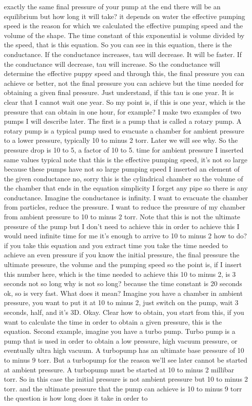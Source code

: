 exactly the same final pressure of your pump at the end there will be an equilibrium but how long it will take? it depends on water the effective pumping speed is the reason for which we calculated the effective pumping speed and the volume of the shape. The time constant of this exponential is volume divided by the speed, that is this equation. So you can see in this equation, there is the conductance. If the conductance increases, tau will decrease. It will be faster. If the conductance will decrease, tau will increase. So the conductance will determine the effective puppy speed and through this, the final pressure you can achieve or better, not the final pressure you can achieve but the time needed for obtaining a given final pressure. Just understand, if this tau is one year. It is clear that I cannot wait one year. So my point is, if this is one year, which is the pressure that can obtain in one hour, for example? I make two examples of two pumps I will describe later. The first is a pump that is called a rotary pump. A rotary pump is a typical pump used to evacuate a chamber for ambient pressure to a lower pressure, typically 10 to minus 2 torr. Later we will see why. So the pressure drop is 10 to 5, a factor of 10 to 5. time for ambient pressure I inserted same values typical note that this is the effective pumping speed, it's not so large because these pumps have not so large pumping speed I inserted an element of the given conductance no, sorry this is the cylindrical chamber so the volume of the chamber that ends in the equation simplicity I forget any pipe so there is any conductance. Imagine the conductance is infinity. I want to evacuate the chamber from particles, reduce the pressure. I want to reduce the pressure of my chamber from ambient pressure to 10 to minus 2 torr. Note that this is not the ultimate pressure of the pump but I don't need to achieve this in order to achieve this I would need infinite time for me it's enough to arrive to 10 to minus 2 how to do? if you take this equation and you extract time you take the time needed to achieve an even pressure if you know the initial pressure, the final pressure the ultimate pressure, the volume and the pumping speed so the point is, if I insert this number here, which is the time needed to achieve this 10 to minus 2, is 3 seconds not so long why is not so long? because the time constant is 20 seconds ok, so is very fast. What does it mean? Imagine you have a chamber in ambient pressure, you want to put it at 10 to minus 2, just switch on the pump, wait 3 seconds, half, and it's 3D. Okay. Clear how to obtain, you start from this, if you want to calculate the time in order to obtain a given pressure, this is the equation. Second example, imagine you have a turbo pump. Turbo pump is a pump that is used in order to obtain a low pressure, high vacuum pressure, or eventually ultra high vacuum. A turbopump has an ultimate base pressure of 10 to minus 9 torr. But a turbopump for the reason we'll see later cannot be started at ambient pressure. A turbopump must be started at 10 to minus 2 millibar torr. So in this case the initial pressure is not ambient pressure but 10 to minus 2 torr. and the ultimate pressure that the pump can achieve is 10 to minus 9 torr the question is how long does it take in order to 